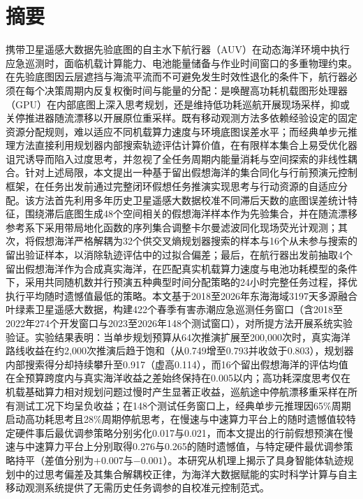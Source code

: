 \section*{摘\quad 要}

携带卫星遥感大数据先验底图的自主水下航行器（AUV）在动态海洋环境中执行应急巡测时，面临机载计算能力、电池能量储备与作业时间窗口的多重物理约束。在先验底图因云层遮挡与海流平流而不可避免发生时效性退化的条件下，航行器必须在每个决策周期内反复权衡时间与能量的分配：是唤醒高功耗机载图形处理器（GPU）在内部底图上深入思考规划，还是维持低功耗巡航开展现场采样，抑或关停推进器随流漂移以开展原位重采样。既有移动观测方法多依赖经验设定的固定资源分配规则，难以适应不同机载算力速度与环境底图误差水平；而经典单步元推理方法直接利用规划器内部搜索轨迹评估计算价值，在有限样本集合上易受优化器诅咒诱导而陷入过度思考，并忽视了全任务周期内能量消耗与空间探索的非线性耦合。针对上述局限，本文提出一种基于留出假想海洋的集合同化与行前预演元控制框架，在任务出发前通过完整闭环假想任务推演实现思考与行动资源的自适应分配。该方法首先利用多年历史卫星遥感大数据校准不同滞后天数的底图误差统计特征，围绕滞后底图生成48个空间相关的假想海洋样本作为先验集合，并在随流漂移参考系下采用带局地化函数的序列集合调整卡尔曼滤波同化现场荧光计观测；其次，将假想海洋严格解耦为32个供交叉熵规划器搜索的样本与16个从未参与搜索的留出验证样本，以消除轨迹评估中的过拟合偏差；最后，在航行器出发前抽取4个留出假想海洋作为合成真实海洋，在匹配真实机载算力速度与电池功耗模型的条件下，采用共同随机数并行预演五种典型时间分配策略的24小时完整任务过程，择优执行平均随时遗憾值最低的策略。本文基于2018至2026年东海海域3197天多源融合叶绿素卫星遥感大数据，构建422个春季有害赤潮应急巡测任务窗口（含2018至2022年274个开发窗口与2023至2026年148个测试窗口），对所提方法开展系统实验验证。实验结果表明：当单步规划预算从64次推演扩展至200,000次时，真实海洋路线收益在约2,000次推演后趋于饱和（从0.749增至0.793并收敛于0.803），规划器内部搜索得分却持续攀升至0.917（虚高0.114），而16个留出假想海洋的评估均值在全预算跨度内与真实海洋收益之差始终保持在0.005以内；高功耗深度思考仅在机载基础算力相对规划问题过慢时产生显著正收益，巡航途中停航漂移重采样在所有测试工况下均呈负收益；在148个测试任务窗口上，经典单步元推理因65\%周期启动高功耗思考且28\%周期停航思考，在慢速与中速算力平台上的随时遗憾值较特定硬件事后最优调参策略分别劣化0.017与0.021，而本文提出的行前假想预演在慢速与中速算力平台上分别取得0.276与0.265的随时遗憾值，与特定硬件最优调参策略持平（差值分别为$+0.007$与$-0.001$）。本研究从机理上揭示了具身智能体轨迹规划中的过思考偏差及其集合解耦校正律，为海洋大数据赋能的实时科学计算与自主移动观测系统提供了无需历史任务调参的自校准元控制范式。

